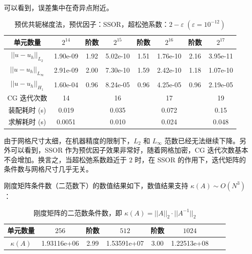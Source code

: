 \documentclass[lang=cn,11pt,a4paper]{elegantpaper}
\begin{document}
可以看到，误差集中在奇异点附近。

\begin{table}[H]
    \centering
    \begin{tabular}{|c|c|c|c|c|c|c|c|}
    \hline
    单元数量                    & $2^{14}$ & 阶数 & $2^{15}$ & 阶数 & $2^{16}$ & 阶数 & $2^{17}$ \\ \hline
    $||u-u_h||_{L_2}$      & 1.90e-09     & 1.92 & 5.02e-10     & 1.51 & 1.76e-10     & 2.16 & 3.95e-11     \\ \hline
    $||u-u_h||_{L_\infty}$ & 2.91e-09     & 2.00 & 7.30e-10     & 1.59 & 2.42e-10     & 1.18 & 1.07e-10     \\ \hline
    $||u-u_h||_{H_1}$      & 1.60e-04     & 0.96 & 8.24e-05     & 0.96 & 4.25e-05     & 0.96 & 2.19e-05     \\ \hline
    CG 迭代次数            & 14 & & 16 & & 17 & & 19\\    
\hline
    装配耗时 (s)           & 0.019         &      & 0.035          &      & 0.072           &      & 0.15     \\ \hline
    求解耗时 (s)           & 0.0051         &      & 0.010          &      & 0.024           &      & 0.048     \\ \hline
    \end{tabular}
    \caption{\small 预优共轭梯度法，预优因子：SSOR，超松弛系数：$2-\varepsilon\;(\varepsilon=10^{-12})$}
\end{table}

由于网格尺寸太细，在机器精度的限制下，$L_2$ 和 $L_\infty$ 范数已经无法继续下降。另外可以看到，SSOR 作为预优因子效果非常好，随着网格加密，CG 迭代次数基本不会增加。换言之，当超松弛系数趋近于 $2$ 时，在 SSOR 的作用下，迭代矩阵的条件数与网格尺寸几乎无关。

刚度矩阵条件数（二范数下）的数值结果如下，数值结果支持 $\kappa(A)\sim O(N^3)$：

\begin{table}[H]
    \centering
    \begin{tabular}{|c|c|c|c|c|c|c|c|}
    \hline
    单元数量                    & $256$ & 阶数 & $512$ & 阶数 & $1024$ \\ \hline
  $\kappa(A)$            & 1.93116e+06 & 2.99 & 1.53591e+07 & 3.00 & 1.22513e+08\\    \hline
    \end{tabular}
    \caption{\small 刚度矩阵的二范数条件数，即 $\kappa(A)=||A||_2\cdot ||A^{-1}||_2$}
\end{table}
\end{document}
